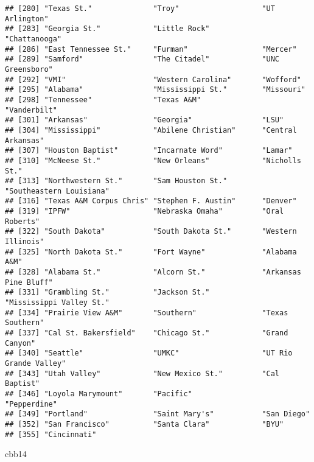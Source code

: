 \documentclass[
]{article}
\newenvironment{Shaded}{\begin{snugshade}}{\end{snugshade}}
\newcommand{\NormalTok}[1]{#1}
\begin{document}
\begin{verbatim}
## [280] "Texas St."              "Troy"                   "UT Arlington"          
## [283] "Georgia St."            "Little Rock"            "Chattanooga"           
## [286] "East Tennessee St."     "Furman"                 "Mercer"                
## [289] "Samford"                "The Citadel"            "UNC Greensboro"        
## [292] "VMI"                    "Western Carolina"       "Wofford"               
## [295] "Alabama"                "Mississippi St."        "Missouri"              
## [298] "Tennessee"              "Texas A&M"              "Vanderbilt"            
## [301] "Arkansas"               "Georgia"                "LSU"                   
## [304] "Mississippi"            "Abilene Christian"      "Central Arkansas"      
## [307] "Houston Baptist"        "Incarnate Word"         "Lamar"                 
## [310] "McNeese St."            "New Orleans"            "Nicholls St."          
## [313] "Northwestern St."       "Sam Houston St."        "Southeastern Louisiana"
## [316] "Texas A&M Corpus Chris" "Stephen F. Austin"      "Denver"                
## [319] "IPFW"                   "Nebraska Omaha"         "Oral Roberts"          
## [322] "South Dakota"           "South Dakota St."       "Western Illinois"      
## [325] "North Dakota St."       "Fort Wayne"             "Alabama A&M"           
## [328] "Alabama St."            "Alcorn St."             "Arkansas Pine Bluff"   
## [331] "Grambling St."          "Jackson St."            "Mississippi Valley St."
## [334] "Prairie View A&M"       "Southern"               "Texas Southern"        
## [337] "Cal St. Bakersfield"    "Chicago St."            "Grand Canyon"          
## [340] "Seattle"                "UMKC"                   "UT Rio Grande Valley"  
## [343] "Utah Valley"            "New Mexico St."         "Cal Baptist"           
## [346] "Loyola Marymount"       "Pacific"                "Pepperdine"            
## [349] "Portland"               "Saint Mary's"           "San Diego"             
## [352] "San Francisco"          "Santa Clara"            "BYU"                   
## [355] "Cincinnati"
\end{verbatim}

\begin{Shaded}
\begin{Highlighting}[]
\NormalTok{cbb14}
\end{Highlighting}
\end{Shaded}
\end{document}
